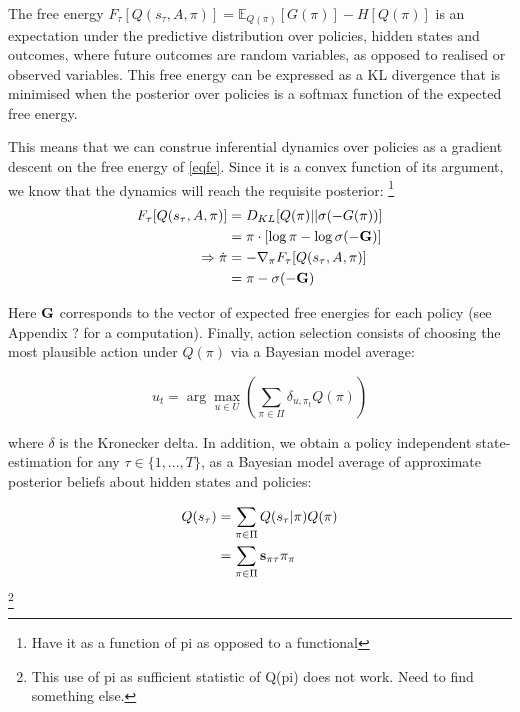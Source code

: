 \documentclass{article}
\theoremstyle{plain}
\theoremstyle{definition}
\theoremstyle{proposition}
\theoremstyle{corollary}
\theoremstyle{lemma}
\theoremstyle{remark}
\theoremstyle{example}
\begin{document}
The free energy $F_\tau  [Q(s_\tau,  A, \pi)] = \mathbb E_{Q(\pi)} [G(\pi)]-H[Q(\pi)]$ is an expectation under the predictive distribution over policies, hidden states and outcomes, where future outcomes are random variables, as opposed to realised or observed variables. This free energy can be expressed as a KL divergence that is minimised when the posterior over policies is a softmax function of the expected free energy.

This means that we can construe inferential dynamics over policies as a gradient descent on the free energy of \eqref{eqfe}. Since it is a convex function of its argument, we know that the dynamics will reach the requisite posterior:
\footnote{Have it as a function of pi as opposed to a functional}
\begin{equation}
    \begin{split}
        F_\tau [Q(s_\tau,  A, \pi)] &= D_{KL}[Q(\pi)||\sigma(-G(\pi))] 
        \\
        &=  \pi \cdot [\log \pi- \log \sigma(- \textbf G)] \\
         \Rightarrow \dot \pi &= - \nabla_\pi F_\tau [Q(s_\tau,  A, \pi)] \\
        &= \pi - \sigma(- \bold G)
    \end{split}
\end{equation}

Here $\bold G$ corresponds to the vector of expected free energies for each policy (see Appendix ? for a computation). Finally, action selection consists of choosing the most plausible action under $Q(\pi)$ via a Bayesian model average:

\begin{equation}
    u_t = \arg \max_{u \in U } \left (\sum_{\pi \in \Pi} \delta_{u, \pi_t} Q(\pi)\right)
\end{equation}

where $\delta$ is the Kronecker delta. In addition, we obtain a policy independent state-estimation for any $\tau \in \{1,...,T\}$, as a Bayesian model average of approximate posterior beliefs about hidden states and policies:

\begin{equation}
\begin{split}
        Q(s_\tau) &= \sum_{\pi \in \Pi} Q(s_\tau |\pi)Q(\pi) \\
        &= \sum_{\pi \in \Pi} \bold s_{\pi \tau} \pi_\pi
\end{split}
\end{equation}
\footnote{This use of pi as sufficient statistic of Q(pi) does not work. Need to find something else.}
\end{document}
